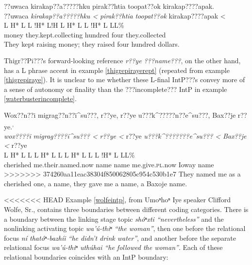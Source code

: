 \documentclass[output=paper]{LSP/langsci}
\begin{document}
\ea\label{waterbusterincomplete}
 	??uwaca kirakap??a?????hku pirak??htia toopat??ok kirakap????apak.\footnotemark\\
\glll	??uwaca	\emph{kirakap??a?????hku <}		\emph{pirak??htia}	\emph{toopat??ok}	{kirakap????apak <}\\
	{\ob L H* L}	{L !H* L!H\cb}	{\ob L H* L}		{}			{L !H* L L\cb{}L\%}\\
	money	they.kept.collecting			hundred		four			they.collected\\
\glt	They kept raising money; they raised four hundred dollars.
\z

Thigr??Pi???s forward-looking reference \emph{r??ye ???name???}, on the other hand, has a L phrase accent in example \ref{thigrepirayerept} (repeated from example \ref{thigrepiraye}). It is unclear to me whether these L-final IntP???s convey more of a sense of autonomy or finality than the ???incomplete??? IntP in example \ref{waterbusterincomplete}.

\ea\label{thigrepirayerept}
Wox??n??i migrag??n??i\^{}su???, r??ye, r??ye u???k\^{}?????n??e\^{}su???, Bax??je r??ye.\footnotemark\textsuperscript{,} \footnotemark\\
\glll	\emph{wox????i} 	\emph{migrag????i\^{}su??? <}		\emph{r??ye <}	r??ye		\emph{u???k\^{}???????e\^{}su??? <}	\emph{Bax??je <}		r??ye\\
	{\ob L H* L}		{L\cb}	{\ob L H* L L\cb}	{\ob L H* L}	{L\cb}	{\ob L !H* L} 		{L\cb{}L\%}\\
	cherished		me.their.named.now			name			name		me.give.\textsc{pl}.now		Ioway				name\\
>>>>>>> 374260aa11eac38304f850062805c954c530b1e7
\glt	They named me as a cherished one, a name, they gave me a name, a Baxoje name.
\z

<<<<<<< HEAD
Example \ref{wolfeintp}, from Umoⁿhoⁿ Iye speaker Clifford Wolfe, Sr., contains three boundaries between different coding categories. There is a boundary between the linking stage topic \emph{shóⁿxti “nevertheless”} and the nonlinking activating topic \emph{wa’ú-thiⁿ “the woman”}, then one before the relational focus \emph{ní thatóⁿ-bazhíi “he didn’t drink water”}, and another before the separate relational focus \emph{wa’ú-thiⁿ uthúhai “he followed the woman”}. Each of these relational boundaries coincides with an IntP boundary:
\end{document}
